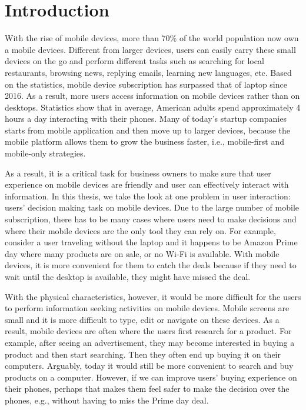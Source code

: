 
\chapter{Introduction}

With the rise of mobile devices, more than 70\% of the world population now own a mobile devices. Different from larger devices, users can easily carry these small devices on the go and perform different tasks such as searching for local restaurants, browsing news, replying emails, learning new languages, etc. Based on the statistics, mobile device subscription has surpassed that of laptop since 2016. As a result, more users access information on mobile devices rather than on desktops. Statistics show that in average, American adults spend approximately 4 hours a day interacting with their phones. Many of today's startup companies starts from mobile application and then move up to larger devices, because the mobile platform allows them to grow the business faster, i.e., mobile-first and mobile-only strategies. 

As a result, it is a critical task for business owners to make sure that user experience on mobile devices are friendly and user can effectively interact with information. In this thesis, we take the look at one problem in user interaction: users' decision making task on mobile devices. Due to the large number of mobile subscription, there has to be many cases where users need to make decisions and where their mobile devices are the only tool they can rely on. For example, consider a user traveling without the laptop and it happens to be Amazon Prime day where many products are on sale, or no Wi-Fi is available. With mobile devices, it is more convenient for them to catch the deals because if they need to wait until the desktop is available, they might have missed the deal. 

With the physical characteristics, however, it would be more difficult for the users to perform information seeking activities on mobile devices. Mobile screens are small and it is more difficult to type, edit or navigate on these devices. As a result, mobile devices are often where the users first research for a product. For example, after seeing an advertisement, they may become interested in buying a product and then start searching. Then they often end up buying it on their computers. Arguably, today it would still be more convenient to search and buy products on a computer. However, if we can improve users' buying experience on their phones, perhaps that makes them feel safer to make the decision over the phones, e.g., without having to miss the Prime day deal. 

